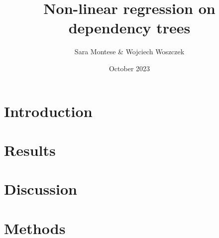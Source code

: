 \documentclass{article}
\title{Non-linear regression on dependency trees}
\author{Sara Montese \& Wojciech Woszczek}
\date{October 2023}
\begin{document}
\maketitle

\section{Introduction}
\section{Results}
\section{Discussion}
\section{Methods}
\end{document}

